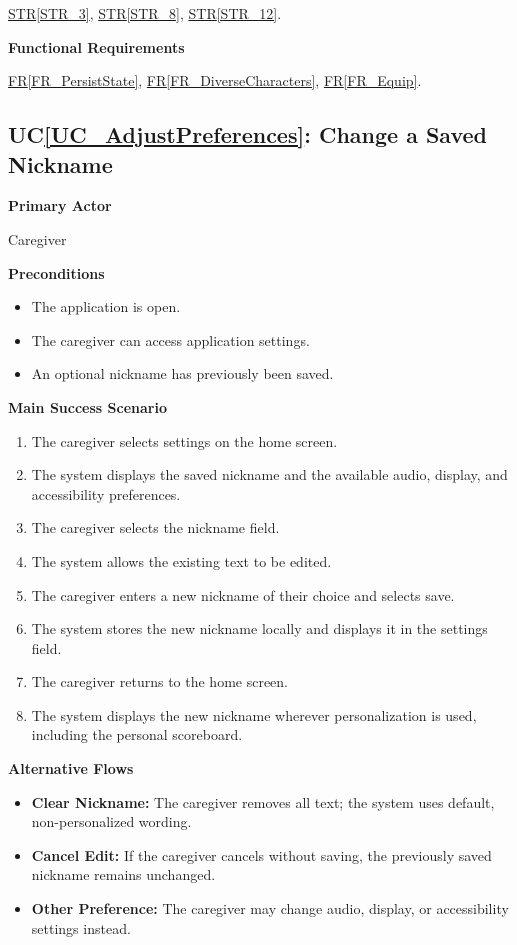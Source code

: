 \documentclass[10pt]{article}
\newcommand{\strref}[1]{\hyperref[#1]{STR\ref*{#1}}}
\newcounter{ucnum} %
\newcommand{\ucheading}[1]{UC\ref*{#1}}
\newcommand{\rref}[1]{\hyperref[#1]{FR\ref*{#1}}}
\begin{document}
\strref{STR_3}, \strref{STR_8}, \strref{STR_12}.

\textbf{Functional Requirements}

\rref{FR_PersistState}, \rref{FR_DiverseCharacters}, \rref{FR_Equip}.

\label{UC_AdjustPreferences}
\subsection{\ucheading{UC_AdjustPreferences}: Change a Saved Nickname}

\textbf{Primary Actor}

Caregiver

\textbf{Preconditions}
\begin{itemize}
    \item The application is open.
    \item The caregiver can access application settings.
    \item An optional nickname has previously been saved.
\end{itemize}

\textbf{Main Success Scenario}
\begin{enumerate}
    \item The caregiver selects settings on the home screen.
    \item The system displays the saved nickname and the
    available audio, display, and accessibility preferences.
    \item The caregiver selects the nickname field.
    \item The system allows the existing text to be edited.
    \item The caregiver enters a new nickname of their choice
    and selects save.
    \item The system stores the new nickname locally and
    displays it in the settings field.
    \item The caregiver returns to the home screen.
    \item The system displays the new nickname wherever
    personalization is used, including the personal scoreboard.
\end{enumerate}

\textbf{Alternative Flows}
\begin{itemize}
    \item \textbf{Clear Nickname:} The caregiver removes all text;
    the system uses default, non-personalized wording.
    \item \textbf{Cancel Edit:} If the caregiver cancels without saving,
    the previously saved nickname remains unchanged.
    \item \textbf{Other Preference:} The caregiver may change
    audio, display, or accessibility settings instead.
\end{itemize}
\end{document}
